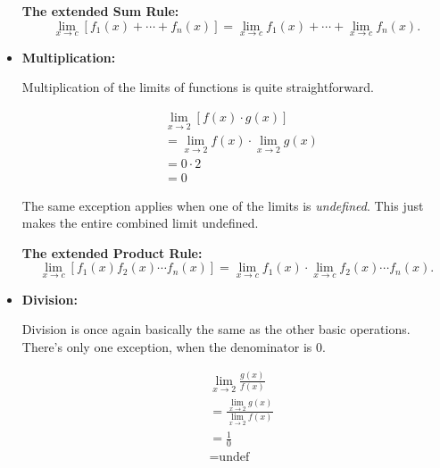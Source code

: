 \documentclass[12pt]{article}
\begin{document}
\begin{itemize}
                    \noindent\textbf{The extended Sum Rule:}
                    \begin{equation*}
                        \lim_{x \to c} \left[ f_1(x) + \cdots + f_n(x) \right]
                        = \lim_{x \to c} f_1(x) + \cdots + \lim_{x \to c} f_n(x).
                    \end{equation*}
                    \smallskip

                \item \textbf{Multiplication:}

                    Multiplication of the limits of functions is quite straightforward.

                    \begin{align*}
                        &\lim_{x \to 2} \left[ f(x) \cdot g(x) \right] \\
                        &= \lim_{x \to 2} f(x) \cdot \lim_{x \to 2} g(x) \\
                        &= 0 \cdot 2 \\
                        &= 0
                    \end{align*}

                    \indent The same exception applies when one of the limits is \textit{undefined}. This just makes the entire combined limit undefined.

                    \noindent\textbf{The extended Product Rule:}
                    \begin{equation*}
                        \lim_{x \to c} \left[ f_1(x) f_2(x) \cdots f_n(x) \right]
                        = \lim_{x \to c} f_1(x) \cdot \lim_{x \to c} f_2(x)
                        \cdots f_n(x).
                    \end{equation*}
                    \smallskip

                \item \textbf{Division:}

                    Division is once again basically the same as the other basic operations. There's only one exception, when the denominator is $0$.

                    \begin{align*}
                        &\lim_{x \to 2} \frac{g(x)}{f(x)} \\
                        &= \frac{\lim_{x \to 2} g(x)}{\lim_{x \to 2} f(x)} \\
                        &= \frac{1}{0} \\
                        &= \text{undef}
                    \end{align*}


\end{itemize}
\end{document}
